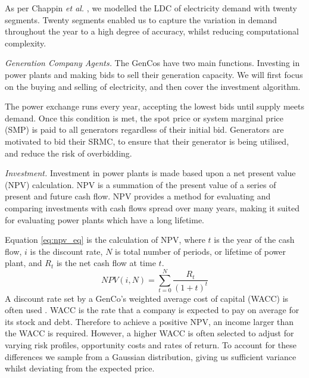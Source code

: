 
As per Chappin \textit{et al.} \cite{Chappin2017}, we modelled the LDC of electricity demand with twenty segments. Twenty segments enabled us to capture the variation in demand throughout the year to a high degree of accuracy, whilst reducing computational complexity. 


\textit{Generation Company Agents.} The GenCos have two main functions. Investing in power plants and making bids to sell their generation capacity. We will first focus on the buying and selling of electricity, and then cover the investment algorithm.

The power exchange runs every year, accepting the lowest bids until supply meets demand. Once this condition is met, the spot price or system marginal price (SMP) is paid to all generators regardless of their initial bid. Generators are motivated to bid their SRMC, to ensure that their generator is being utilised, and reduce the risk of overbidding.

\textit{Investment.} Investment in power plants is made based upon a net present value (NPV) calculation. NPV is a summation of the present value of a series of present and future cash flow. NPV provides a method for evaluating and comparing investments with cash flows spread over many years, making it suited for evaluating power plants which have a long lifetime.  

Equation \ref{eq:npv_eq} is the calculation of NPV, where $t$ is the year of the cash flow, $i$ is the discount rate, $N$ is total number of periods, or lifetime of power plant, and $R_t$ is the net cash flow at time $t$.
\begin{equation} \label{eq:npv_eq}
NPV(i, N) = \sum_{t=0}^{N}\frac{R_t}{(1+t)^t}
\end{equation}
A discount rate set by a GenCo's weighted average cost of capital (WACC) is often used \cite{KincheloeStephenC1990TWAC}. WACC is the rate that a company is expected to pay on average for its stock and debt. Therefore to achieve a positive NPV, an income larger than the WACC is required. However, a higher WACC is often selected to adjust for varying risk profiles, opportunity costs and rates of return. To account for these differences we sample from a Gaussian distribution, giving us sufficient variance whilst deviating from the expected price.

